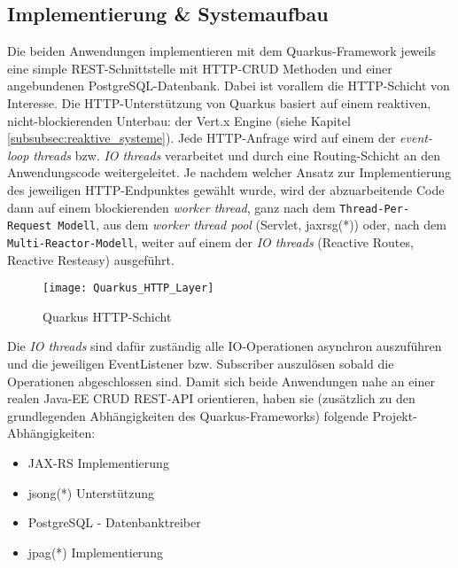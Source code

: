 \subsection{Implementierung \& Systemaufbau}
\label{section:implementierung}
Die beiden Anwendungen implementieren mit dem Quarkus-Framework jeweils eine simple REST-Schnittstelle mit HTTP-CRUD Methoden
und einer angebundenen PostgreSQL-Datenbank.
Dabei ist vorallem die HTTP-Schicht von Interesse. Die HTTP-Unterstützung von Quarkus basiert auf einem reaktiven, nicht-blockierenden
Unterbau: der Vert.x Engine (siehe Kapitel \ref{subsubsec:reaktive_systeme}).
Jede HTTP-Anfrage wird auf einem der \textit{event-loop threads} bzw. \textit{IO threads}
verarbeitet und durch eine Routing-Schicht an den Anwendungscode weitergeleitet.
Je nachdem welcher Ansatz zur Implementierung des jeweiligen HTTP-Endpunktes gewählt wurde,
wird der abzuarbeitende Code dann auf einem blockierenden \textit{worker thread}, ganz nach dem \verb|Thread-Per-Request Modell|, aus dem
\textit{worker thread pool} (Servlet, \Gls{jaxrsg}(*)) oder, nach dem \verb|Multi-Reactor-Modell|, weiter auf einem der
\textit{IO threads} (Reactive Routes, Reactive Resteasy) ausgeführt.

\newpage
\begin{figure}[h]
    \centering
    \texttt{[image: Quarkus\_HTTP\_Layer]}
    \caption{Quarkus HTTP-Schicht \parencite{QuarkusReactiveRoutes}}
    \label{fig:quarkus_http_schicht}
\end{figure}

Die \textit{IO threads} sind dafür zuständig alle IO-Operationen asynchron auszuführen und die jeweiligen EventListener bzw. Subscriber
auszulösen sobald die Operationen abgeschlossen sind.
Damit sich beide Anwendungen nahe an einer realen Java-EE CRUD REST-API orientieren, haben
sie (zusätzlich zu den grundlegenden Abhängigkeiten des Quarkus-Frameworks) folgende Projekt-Abhängigkeiten:
\begin{itemize}
    \item JAX-RS Implementierung
    \item \Gls{jsong}(*) Unterstützung
    \item PostgreSQL - Datenbanktreiber
    \item \Gls{jpag}(*) Implementierung
\end{itemize}

